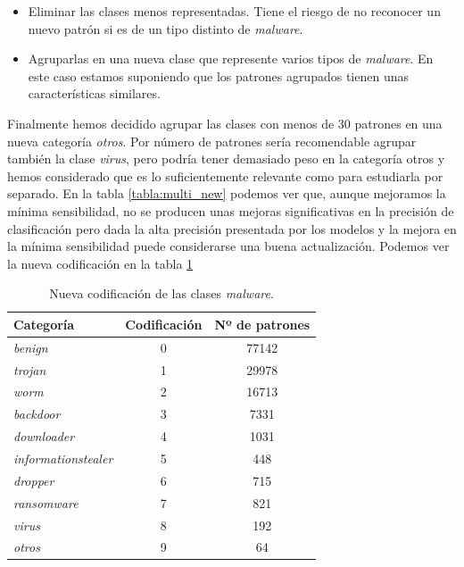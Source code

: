 \begin{itemize}
	\item Eliminar las clases menos representadas. Tiene el riesgo de no reconocer un nuevo patrón si es de un tipo distinto de \textit{malware}.
	\item Agruparlas en una nueva clase que represente varios tipos de \textit{malware}. En este caso estamos suponiendo que los patrones agrupados tienen unas características similares.
\end{itemize}

\vspace{1em}

Finalmente hemos decidido agrupar las clases con menos de 30 patrones en una nueva categoría \textit{otros}. Por número de patrones sería recomendable agrupar también la clase \textit{virus}, pero podría tener demasiado peso en la categoría otros y hemos considerado que es lo suficientemente relevante como para estudiarla por separado. En la tabla \ref{tabla:multi_new} podemos ver que, aunque mejoramos la mínima sensibilidad, no se producen unas mejoras significativas en la precisión de clasificación pero dada la alta precisión presentada por los modelos y la mejora en la mínima sensibilidad puede considerarse una buena actualización. Podemos ver la nueva codificación en la tabla \ref{tabla:nueva_codificacion_malware}

\begin{table}[th]
	\centering
	\begin{tabular}{ |m{4cm}|c|c| }
		\hline
		\rowcolor{LightCyan}
		Categoría                   & Codificación & Nº de patrones \\
		\hline
		\textit{benign}             & 0            & 77142 \\
		\textit{trojan}             & 1            & 29978 \\
		\textit{worm}               & 2            & 16713 \\
		\textit{backdoor}           & 3            & 7331  \\
		\textit{downloader}         & 4            & 1031  \\
		\textit{informationstealer} & 5            & 448   \\
		\textit{dropper}            & 6            & 715   \\
		\textit{ransomware}         & 7            & 821   \\
		\textit{virus}              & 8            & 192   \\
		\textit{otros}              & 9            & 64    \\
		\hline
	\end{tabular}
	\caption{Nueva codificación de las clases \textit{malware}.}
	\label{tabla:nueva_codificacion_malware}
\end{table}

